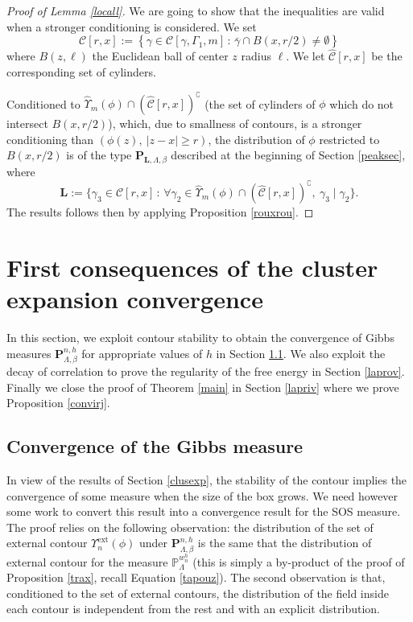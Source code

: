 \documentclass[JEP,XML,SOM,Unicode, NoFloatCountersInSection]{cedram}
\let\mathcal\mathscr
\newcommand{\sep}{\,:\,}
\numberwithin{equation}{section}
\theoremstyle{plain}
\theoremstyle{definition}
\newcommand{\ext}{\mathrm{ext}}
\newcommand{\cc}{\complement}
\newcommand{\cC}{{\ensuremath{\mathcal C}} }
\newcommand{\bP}{{\ensuremath{\mathbf P}} }
\newcommand{\bL}{{\ensuremath{\mathbf L}} }
\newcommand{\bbP}{{\ensuremath{\mathbb P}} }
\newcommand{\gb}{\beta}
\newcommand{\gG}{\Gamma}
\newcommand{\gL}{\Lambda}
\begin{document}
\begin{proof}[Proof of Lemma \ref{locall}]
We are going to show that the inequalities are valid when a stronger conditioning is considered.
We set\vspace*{-3pt}
\[
\cC[r,x]:=\left\{ \gamma \in \cC[\gamma,\gG_1,m] \sep \bar \gamma\cap B(x,r/2)\ne \emptyset \right\}
\]
where $B(z,\ell)$
the Euclidean ball of center $z$ radius $\ell$. We let $\hat \cC[r,x]$ be the corresponding set of cylinders.

Conditioned to $\hat\Upsilon_{m}(\phi)\cap (\hat \cC[r,x])^{\cc}$ (the set of cylinders of $\phi$ which do not intersect $B(x,r/2)$), which, due to smallness of contours,
is a stronger conditioning than
$(\phi(z),\ |z-x|\ge r)$,
the distribution of
$\phi$ restricted to $B(x,r/2)$
is of the type $\bP_{\bL,\gL,\gb}$ described at the beginning of Section \ref{peaksec}, where
\[
\bL:=\{\gamma_3 \in \cC[r,x] \sep \forall \gamma_2\in \hat\Upsilon_{m}(\phi)\cap (\hat \cC[r,x])^{\cc},\ \gamma_3 \mid \gamma_2 \}.
\]
The results follows then by applying Proposition \ref{rouxrou}.
\end{proof}

\section{First consequences of the cluster expansion convergence}\label{dalast}

In this section, we exploit contour stability to obtain
the convergence of Gibbs measures $\bP^{n,h}_{\gL,\gb}$ for appropriate values of $h$ in Section \ref{moots}.
We also exploit the decay of correlation to prove the regularity of the free energy in Section \ref{laprov}.
Finally we close the proof of Theorem \ref{main} in Section \ref{lapriv} where we prove Proposition \ref{convirj}.

\subsection{Convergence of the Gibbs measure}\label{moots}

In view of the results of Section \ref{clusexp}, the stability of the contour implies the convergence of some measure when the size of the box grows.
We need however some work to convert this result into a convergence result for the SOS measure.
The proof relies on the following observation: the distribution of the set of external contour $\Upsilon^{\ext}_n(\phi)$
under $\bP^{n,h}_{\gL,\gb}$ is the same that the distribution of external contour for the measure $\bbP^{w^{h}_{n}}_{\gL}$
(this is simply a by-product of the proof of Proposition \ref{trax}, recall Equation \eqref{tapouz}).
The second observation is that, conditioned to the set of external contours, the distribution of the field inside each contour is independent from the
rest and with an explicit distribution.
\end{document}
